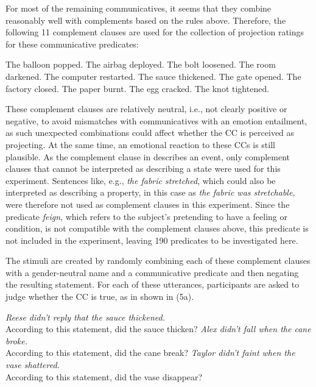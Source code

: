 \documentclass[11pt,fleqn]{article}
\newcommand{\6}{\mbox{$[\hspace*{-.6mm}[$}}
\newcommand{\9}{\mbox{$]\hspace*{-.6mm}]$}}
\begin{document}
For most of the remaining communicatives, it seems that they combine reasonably well with complements based on the rules above. Therefore, the following 11 complement clauses are used for the collection of projection ratings for these communicative predicates:
\begin{exe}
	\ex
	\begin{xlist}
		\ex The balloon popped.
		\ex The airbag deployed.
		\ex The bolt loosened.
		\ex The room darkened.
		\ex The computer restarted.
		\ex The sauce thickened.
		\ex The gate opened.
		\ex The factory closed.
		\ex The paper burnt.
		\ex The egg cracked.
		\ex The knot tightened.
	\end{xlist}
\end{exe}

These complement clauses are relatively neutral, i.e., not clearly positive or negative, to avoid mismatches with communicatives with an emotion entailment, as such unexpected combinations could affect whether the CC is perceived as projecting. At the same time, an emotional reaction to these CCs is still plausible. As the complement clause in \cite{white-rawlins-nels2018} describes an event, only complement clauses that cannot be interpreted as describing a state were used for this experiment. Sentences like, e.g., \emph{the fabric stretched}, which could also be interpreted as describing a property, in this case as \emph{the fabric was stretchable}, were therefore not used as complement clauses in this experiment. Since the predicate \emph{feign}, which refers to the subject's pretending to have a feeling or condition, is not compatible with the complement clauses above, this predicate is not included in the experiment, leaving 190 predicates to be investigated here. 

The stimuli are created by randomly combining each of these complement clauses with a gender-neutral name and a communicative predicate and then negating the resulting statement. For each of these utterances, participants are asked to judge whether the CC is true, as in shown in (5a). 

\begin{exe}
	\ex
	\begin{xlist}
		\ex \emph{Reese didn't reply that the sauce thickened.} \\
		According to this statement, did the sauce thicken?
		\ex \emph{Alex didn't fall when the cane broke.} \\
		According to this statement, did the cane break?
		\ex \emph{Taylor didn't faint when the vase shattered.} \\
		According to this statement, did the vase disappear?
	\end{xlist}
\end{exe}
\end{document}
